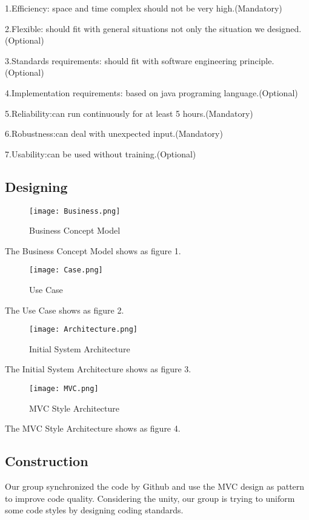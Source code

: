 \documentclass[12pt]{amsart}
\begin{document}
1.Efficiency: space and time complex should not be very high.(Mandatory)

2.Flexible: should fit with general situations not only the situation we designed.(Optional)

3.Standards requirements: should fit with software engineering principle.(Optional)

4.Implementation requirements: based on java programing language.(Optional)

5.Reliability:can run continuously for at least 5 hours.(Mandatory)

6.Robustness:can deal with unexpected input.(Mandatory)

7.Usability:can be used without training.(Optional)

\subsection{Designing}

\begin{figure}[!b]
\texttt{[image: Business.png]}
\caption{Business Concept Model}
\end{figure}

The Business Concept Model shows as figure 1.

\begin{figure}[!tb]
\texttt{[image: Case.png]}
\caption{Use Case}
\end{figure}
The Use Case shows as figure 2.

\begin{figure}[!tb]
 \texttt{[image: Architecture.png]}
 \caption{Initial System Architecture}\label{first-img}
\end{figure}
The Initial System Architecture shows as figure 3.

\begin{figure}[!tb]
 \texttt{[image: MVC.png]}
 \caption{MVC Style Architecture}\label{second-img}
\end{figure}
The MVC Style Architecture shows as figure 4.

\subsection{Construction}

Our group synchronized the code by Github and use the MVC design as pattern to improve code quality. Considering the unity, our group is trying to uniform some code styles by designing coding standards.
\end{document}

